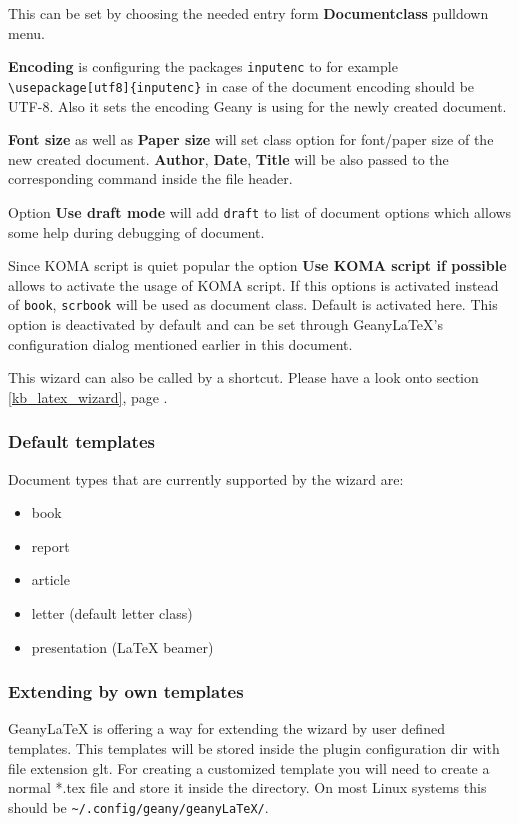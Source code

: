\documentclass[%
a4paper,%
10pt,%
oneside,%
DIV18,
headsepline,
plainheadsepline,
footsepline,
plainfootsepline,
bibtotoc,%
liststotoc,%
BCOR12mm,%
halfparskip,%
openany,%
]{scrartcl}
\begin{document}
This can be set by choosing the needed entry form
\textbf{Documentclass} pulldown menu.

\textbf{Encoding} is configuring the packages \texttt{inputenc} to
for example \texttt{\textbackslash usepackage[utf8]\{inputenc\}} in
case of the document encoding should be UTF-8. Also it sets the
encoding Geany is using for the newly created document.

\textbf{Font size} as well as \textbf{Paper size} will set class option
for font/paper size of the new created document. \textbf{Author},
\textbf{Date}, \textbf{Title} will be also passed to the corresponding
command inside the file header.

Option \textbf{Use draft mode} will add \texttt{draft} to list of
document options which allows some help during debugging of document.

Since KOMA script is quiet popular the option \textbf{Use KOMA script
if possible} allows to activate the usage of KOMA script. If this
options is activated instead of \texttt{book}, \texttt{scrbook} will
be used as document class. Default is activated here. This option is
deactivated by default and can be set through Geany\LaTeX{}'s
configuration dialog mentioned earlier in this document.

This wizard can also be called by a shortcut. Please have a look onto
section \ref{kb_latex_wizard}, page \pageref{kb_latex_wizard}.

\subsubsection{Default templates}
Document types that are currently supported by the wizard are:
\begin{itemize}
	\item book
	\item report
	\item article
	\item letter (default letter class)
	\item presentation (\LaTeX{} beamer)
\end{itemize}

\subsubsection{Extending by own templates}
\label{sec:extending_wizard_by_own_templates}
Geany\LaTeX{} is offering a way for extending the wizard by user
defined templates. This templates will be stored inside the plugin
configuration dir with file extension glt. For creating a
customized template you will need to create a normal *.tex file and
store it inside the directory. On most Linux systems this should be
\texttt{\textasciitilde/.config/geany/geanyLaTeX/}.
\end{document}

